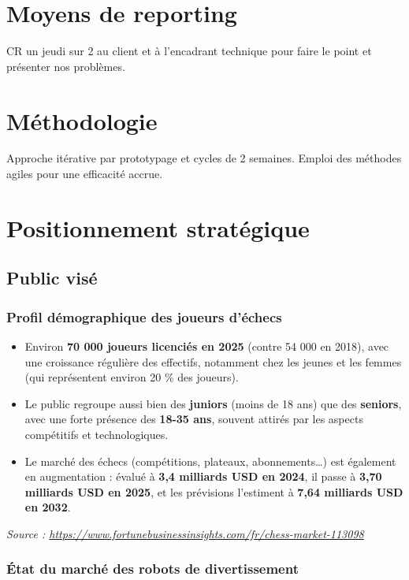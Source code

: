 \documentclass{article}
\begin{document}
\section{Moyens de reporting}
CR un jeudi sur 2 au client et à l'encadrant technique pour faire le point et présenter nos problèmes.
\section{Méthodologie }
Approche itérative par prototypage et cycles de 2 semaines. Emploi des méthodes agiles pour une efficacité accrue.
\section{Positionnement stratégique}
\subsection{Public visé}
\subsubsection{Profil démographique des joueurs d’échecs}

\begin{itemize}
    \item Environ \textbf{70 000 joueurs licenciés en 2025} (contre 54 000 en 2018), avec une croissance régulière des effectifs, notamment chez les jeunes et les femmes (qui représentent environ 20 \% des joueurs).
    \item Le public regroupe aussi bien des \textbf{juniors} (moins de 18 ans) que des \textbf{seniors}, avec une forte présence des \textbf{18-35 ans}, souvent attirés par les aspects compétitifs et technologiques.
    \item Le marché des échecs (compétitions, plateaux, abonnements\dots) est également en augmentation : évalué à \textbf{3,4 milliards USD en 2024}, il passe à \textbf{3,70 milliards USD en 2025}, et les prévisions l’estiment à \textbf{7,64 milliards USD en 2032}.
\end{itemize}

\textit{Source : \url{https://www.fortunebusinessinsights.com/fr/chess-market-113098}}

\subsubsection{État du marché des robots de divertissement}
\end{document}
